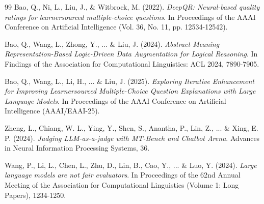 \begin{thebibliography}{99}
Bao, Q., Ni, L., Liu, J., \& Witbrock, M. (2022).
\textit{DeepQR: Neural-based quality ratings for learnersourced multiple-choice questions}.
In Proceedings of the AAAI Conference on Artificial Intelligence (Vol. 36, No. 11, pp. 12534-12542).

Bao, Q., Wang, L., Zhong, Y., ... \& Liu, J. (2024).
\textit{Abstract Meaning Representation-Based Logic-Driven Data Augmentation for Logical Reasoning}.
In Findings of the Association for Computational Linguistics: ACL 2024, 7890-7905.

Bao, Q., Wang, L., Li, H., ... \& Liu, J. (2025).
\textit{Exploring Iterative Enhancement for Improving Learnersourced Multiple-Choice Question Explanations with Large Language Models}.
In Proceedings of the AAAI Conference on Artificial Intelligence (AAAI/EAAI-25).

Zheng, L., Chiang, W. L., Ying, Y., Shen, S., Anantha, P., Lin, Z., ... \& Xing, E. P. (2024).
\textit{Judging LLM-as-a-judge with MT-Bench and Chatbot Arena}.
Advances in Neural Information Processing Systems, 36.

Wang, P., Li, L., Chen, L., Zhu, D., Lin, B., Cao, Y., ... \& Luo, Y. (2024).
\textit{Large language models are not fair evaluators}.
In Proceedings of the 62nd Annual Meeting of the Association for Computational Linguistics (Volume 1: Long Papers), 1234-1250.

\end{thebibliography}
